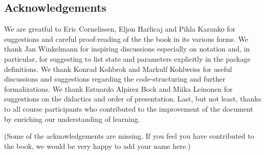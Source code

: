 \subsection{Acknowledgements}
We are greatful to Eric Cornelissen, Eljon Harlicaj and Pihla Karanko for suggestions and careful proof-reading of the the book in its various forms. We thank Jan Winkelmann for inspiring discussions especially on notation and, in particular, for suggesting to list state and parameters explicitly in the package definitions. We thank Konrad Kohbrok and Markulf Kohlweiss for useful discussions and suggestions regarding the code-structuring and further formalizations. We thank Estuardo Alpirez Bock and Miika Leinonen for suggestions on the didactics and order of presentation. Last, but not least, thanks to all course participants who contributed to the improvement of the document by enriching our understanding of learning.

(Some of the acknowledgements are missing. If you feel you have contributed to the book, we would be very happy to add your name here.)